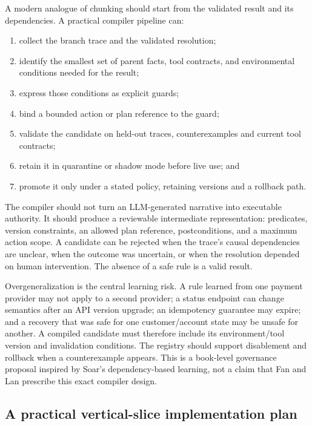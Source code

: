 A modern analogue of chunking should start from the validated result and its dependencies. A practical compiler pipeline can:

\begin{enumerate}
  \item collect the branch trace and the validated resolution;
  \item identify the smallest set of parent facts, tool contracts, and environmental conditions needed for the result;
  \item express those conditions as explicit guards;
  \item bind a bounded action or plan reference to the guard;
  \item validate the candidate on held-out traces, counterexamples and current tool contracts;
  \item retain it in quarantine or shadow mode before live use; and
  \item promote it only under a stated policy, retaining versions and a rollback path.
\end{enumerate}

The compiler should not turn an LLM-generated narrative into executable authority. It should produce a reviewable intermediate representation: predicates, version constraints, an allowed plan reference, postconditions, and a maximum action scope. A candidate can be rejected when the trace's causal dependencies are unclear, when the outcome was uncertain, or when the resolution depended on human intervention. The absence of a safe rule is a valid result.

Overgeneralization is the central learning risk. A rule learned from one payment provider may not apply to a second provider; a status endpoint can change semantics after an API version upgrade; an idempotency guarantee may expire; and a recovery that was safe for one customer/account state may be unsafe for another. A compiled candidate must therefore include its environment/tool version and invalidation conditions. The registry should support disablement and rollback when a counterexample appears. This is a book-level governance proposal inspired by Soar's dependency-based learning, not a claim that Fan and Lan prescribe this exact compiler design.

\subsection{A practical vertical-slice implementation plan}
\label{subsec:ch13-vertical-slice}

